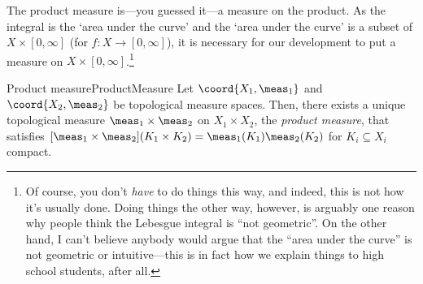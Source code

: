 The product measure is---you guessed it---a measure on the product.  As the integral is the `area under the curve' and the `area under the curve' is a subset of $X\times [0,\infty ]$ (for $f\colon X\rightarrow [0,\infty ]$), it is necessary for our development to put a measure on $X\times [0,\infty ]$.\footnote{Of course, you don't \emph{have} to do things this way, and indeed, this is not how it's usually done.  Doing things the other way, however, is arguably one reason why people think the Lebesgue integral is ``not geometric''.  On the other hand, I can't believe anybody would argue that the ``area under the curve'' is not geometric or intuitive---this is in fact how we explain things to high school students, after all.}
\begin{thm}{Product measure}{ProductMeasure}
Let $\coord{X_1,\meas _1}$ and $\coord{X_2,\meas _2}$ be topological measure spaces.  Then, there exists a unique topological measure $\meas _1\times \meas _2$ on $X_1\times X_2$, the \emph{product measure}, that satisfies $[\meas _1\times \meas _2](K_1\times K_2)=\meas _1(K_1)\meas _2(K_2)$ for $K_i\subseteq X_i$ compact.


\end{thm}
